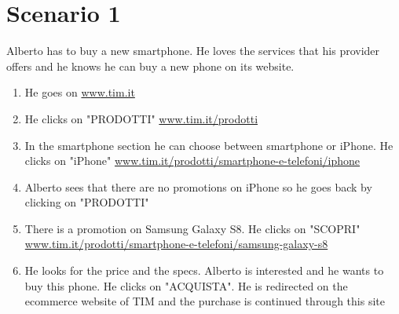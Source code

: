 \section{Scenario 1}
Alberto has to buy a new smartphone. He loves the services that his provider offers and he knows he can buy a new phone on its website.

\begin{enumerate}
	\item He goes on \url{www.tim.it}
	\item He clicks on "PRODOTTI" \url{www.tim.it/prodotti}
	\item In the smartphone section he can choose between smartphone or iPhone. He clicks on "iPhone" \url{www.tim.it/prodotti/smartphone-e-telefoni/iphone}
	\item Alberto sees that there are no promotions on iPhone so he goes back by clicking on "PRODOTTI"
	\item There is a promotion on Samsung Galaxy S8. He clicks on "SCOPRI" \url{www.tim.it/prodotti/smartphone-e-telefoni/samsung-galaxy-s8}
	\item He looks for the price and the specs. Alberto is interested and he wants to buy this phone. He clicks on "ACQUISTA". He is redirected on the ecommerce website of TIM and the purchase is continued through this site
\end{enumerate}

